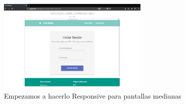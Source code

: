 \documentclass[12pt, fleqn]{report}                             %
\begin{document}
        \begin{figure}[ht]
            \centering
            \includegraphics[width=0.65\textwidth]{EjemploInterfazSegundaParte6}
            \caption{Empezamos a hacerlo Responsive para pantallas medianas}
        \end{figure}



    
\end{document}
